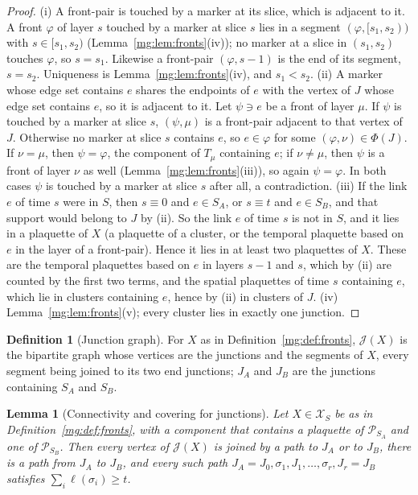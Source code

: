 \documentclass[11pt,a4paper]{article}
\newtheorem{lemma}[theorem]{Lemma}
\theoremstyle{definition}
\newtheorem{definition}[theorem]{Definition}
\theoremstyle{remark}
\newcommand{\cP}{\mathcal{P}}
\newcommand{\cX}{\mathcal{X}}
\begin{document}
\begin{proof}
(i) A front-pair is touched by a marker at its slice, which is adjacent to it. A front $\varphi$ of layer $s$ touched by a marker at slice $s$ lies in a
segment $(\varphi,[s_1,s_2))$ with $s\in[s_1,s_2)$ (Lemma~\ref{mg:lem:fronts}(iv)); no marker at a slice in $(s_1,s_2)$ touches $\varphi$, so $s=s_1$.
Likewise a front-pair $(\varphi,s-1)$ is the end of its segment, $s=s_2$. Uniqueness is Lemma~\ref{mg:lem:fronts}(iv), and $s_1<s_2$.
(ii) A marker whose edge set contains $e$ shares the endpoints of $e$ with the vertex of $J$ whose edge set contains $e$, so it is adjacent to it.
Let $\psi\ni e$ be a front of layer $\mu$. If $\psi$ is touched by a marker at slice $s$, $(\psi,\mu)$ is a front-pair adjacent to that vertex of $J$.
Otherwise no marker at slice $s$ contains $e$, so $e\in\varphi$ for some $(\varphi,\nu)\in\Phi(J)$. If $\nu=\mu$, then $\psi=\varphi$, the component of $T_\mu$
containing $e$; if $\nu\neq\mu$, then $\psi$ is a front of layer $\nu$ as well (Lemma~\ref{mg:lem:fronts}(iii)), so again $\psi=\varphi$. In both cases
$\psi$ is touched by a marker at slice $s$ after all, a contradiction.
(iii) If the link $e$ of time $s$ were in $S$, then $s\equiv0$ and $e\in S_A$, or $s\equiv t$ and $e\in S_B$, and that support would belong to $J$ by
(ii). So the link $e$ of time $s$ is not in $S$, and it
lies in a plaquette of $X$ (a plaquette of a cluster, or the temporal plaquette based on $e$ in the layer of a front-pair). Hence it lies in at least two
plaquettes of $X$. These are the temporal plaquettes based on $e$ in layers $s-1$ and $s$, which by (ii) are counted by the first two terms, and the
spatial plaquettes of time $s$ containing $e$, which lie in clusters containing $e$, hence by (ii) in clusters of $J$.
(iv) Lemma~\ref{mg:lem:fronts}(v); every cluster lies in exactly one junction.
\end{proof}

\begin{definition}[Junction graph]\label{mg:def:jgraph}
For $X$ as in Definition~\ref{mg:def:fronts}, $\mathcal J(X)$ is the bipartite graph whose vertices are the junctions and the segments of $X$, every
segment being joined to its two end junctions; $J_A$ and $J_B$ are the junctions containing $S_A$ and $S_B$.
\end{definition}

\begin{lemma}[Connectivity and covering for junctions]\label{mg:lem:jgraph}
Let $X\in\cX_S$ be as in Definition~\ref{mg:def:fronts}, with a component that contains a plaquette of $\cP_{S_A}$ and one of $\cP_{S_B}$. Then every
vertex of $\mathcal J(X)$ is joined by a path to $J_A$ or to $J_B$, there is a path from $J_A$ to $J_B$, and every such path
$J_A=J_0,\sigma_1,J_1,\dots,\sigma_r,J_r=J_B$ satisfies $\sum_i\ell(\sigma_i)\ge t$.
\end{lemma}
\end{document}
